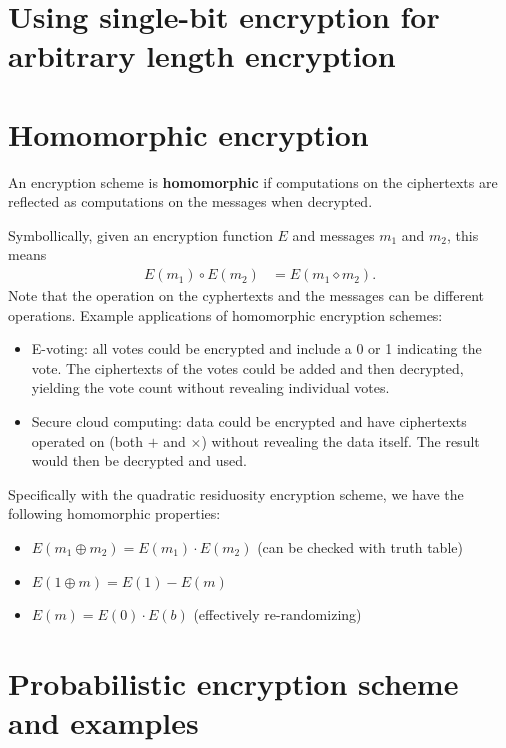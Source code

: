 \documentclass[10pt]{article}
\begin{document}
\section{Using single-bit encryption for arbitrary length encryption}

\section{Homomorphic encryption}

\begin{definition}An encryption scheme is \textbf{homomorphic} if computations on the ciphertexts are reflected as computations on the messages when decrypted.\end{definition}

Symbollically, given an encryption function $E$ and messages $m_1$ and $m_2$, this means
\begin{align*}
E(m_1) \circ E(m_2) &= E(m_1 \diamond m_2).
\end{align*}
Note that the operation on the cyphertexts and the messages can be different operations. Example applications of homomorphic encryption schemes:
\begin{itemize}
	\item E-voting: all votes could be encrypted and include a 0 or 1 indicating the vote. The ciphertexts of the votes could be added and then decrypted, yielding the vote count without revealing individual votes.
	\item Secure cloud computing: data could be encrypted and have ciphertexts operated on (both $+$ and $\times$) without revealing the data itself. The result would then be decrypted and used.
\end{itemize}
Specifically with the quadratic residuosity encryption scheme, we have the following homomorphic properties:
\begin{itemize}
	\item $E(m_1 \oplus m_2) = E(m_1) \cdot E(m_2)$ (can be checked with truth table)
	\item $E(1 \oplus m) = E(1) - E(m)$
	\item $E(m) = E(0) \cdot E(b)$ (effectively re-randomizing)
\end{itemize}





\section{Probabilistic encryption scheme and examples}
\end{document}
